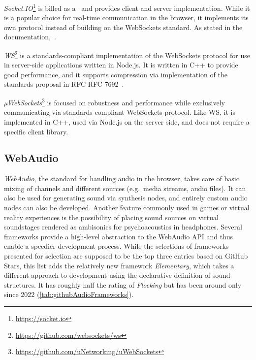 

\emph{Socket.IO}\footnote{\url{https://socket.io}} is billed as a~ and provides client and server implementation.
While it is a popular choice for real-time communication in the browser, it implements its own protocol instead of building on the WebSockets standard.
As stated in the documentation,~.

\emph{WS}\footnote{\url{https://github.com/websockets/ws}} is a standards-compliant implementation of the WebSockets protocol for use in server-side applications written in Node.js.
It is written in C++ to provide good performance, and it supports compression via implementation of the standards proposal in \ac{RFC} RFC 7692~.

\emph{µWebSockets}\footnote{\url{https://github.com/uNetworking/uWebSockets}} is focused on robustness and performance while exclusively communicating via standards-compliant WebSockets protocol.
Like WS, it is implemented in C++, used via Node.js on the server side, and does not require a specific client library.

\subsection{WebAudio}
\label{subsec:webaudio}

\emph{WebAudio}, the standard for handling audio in the browser, takes care of basic mixing of channels and different sources (e.g.\ media streams, audio files).
It can also be used for generating sound via synthesis nodes, and entirely custom audio nodes can also be developed.
Another feature commonly used in games or virtual reality experiences is the possibility of placing sound sources on virtual soundstages rendered as ambisonics for psychoacoustics in headphones.
Several frameworks provide a high-level abstraction to the WebAudio \ac{API} and thus enable a speedier development process.
While the selections of frameworks presented for selection are supposed to be the top three entries based on GitHub Stars, this list adds the relatively new framework \emph{Elementary}, which takes a different approach to development using the declarative definition of sound structures.
It has roughly half the rating of \emph{Flocking} but has been around only since 2022 (\ref{tab:githubAudioFrameworks}).

